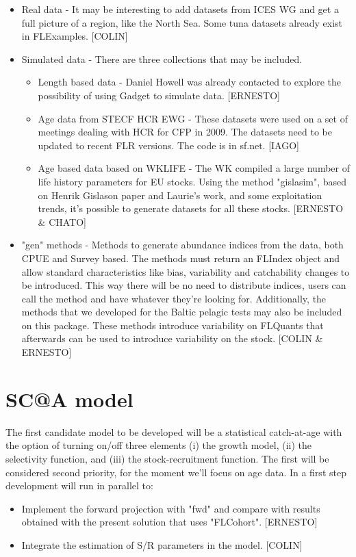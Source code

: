 \documentclass[10pt,a4paper]{article}
\begin{document}
\begin{itemize}
	\item Real data - It may be interesting to add datasets from ICES WG and get a full picture of a region, like the North Sea. Some tuna datasets already exist in FLExamples. [COLIN]  
	\item Simulated data - There are three collections that may be included.
	\begin{itemize}
		\item Length based data - Daniel Howell was already contacted to explore the possibility of using Gadget to simulate data. [ERNESTO]
		\item Age data from STECF HCR EWG - These datasets were used on a set of meetings dealing with HCR for CFP in 2009. The datasets need to be updated to recent FLR versions. The code is in sf.net. [IAGO]
		\item Age based data based on WKLIFE - The WK compiled a large number of life history parameters for EU stocks. Using the method "gislasim", based on Henrik Gislason paper and Laurie's work, and some exploitation trends, it's possible to generate datasets for all these stocks. [ERNESTO \& CHATO]   
	\end{itemize}
	\item "gen" methods - Methods to generate abundance indices from the data, both CPUE and Survey based. The methods must return an FLIndex object and allow standard characteristics like bias, variability and catchability changes to be introduced. This way there will be no need to distribute indices, users can call the method and have whatever they're looking for. Additionally, the methods that we developed for the Baltic pelagic tests may also be included on this package. These methods introduce variability on FLQuants that afterwards can be used to introduce variability on the stock. [COLIN \& ERNESTO]
\end{itemize}

\section{SC@A model}
The first candidate model to be developed will be a statistical catch-at-age with the option of turning on/off three elements (i) the growth model, (ii) the selectivity function, and (iii) the stock-recruitment function. The first will be considered second priority, for the moment we'll focus on age data.
In a first step development will run in parallel to:
\begin{itemize}
	\item Implement the forward projection with "fwd" and compare with results obtained with the present solution that uses "FLCohort". [ERNESTO]
	\item Integrate the estimation of S/R parameters in the model. [COLIN]
\end{itemize}
\end{document}
